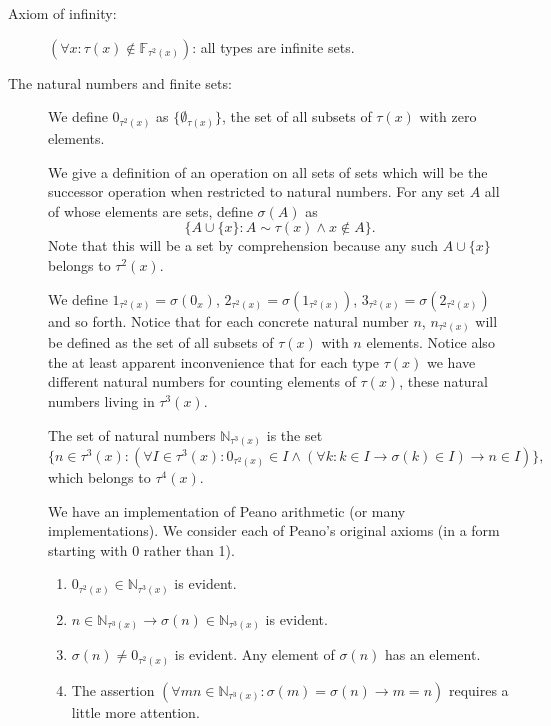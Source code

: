 \documentclass[12pt]{article}
\begin{document}
\begin{description}
\item[Axiom of infinity:]  $(\forall x:\tau(x) \not\in \mathbb F_{\tau^2(x)})$:   all types are infinite sets.

\item[The natural numbers and finite sets:]  We define $0_{\tau^2(x)}$ as $\{\emptyset_{\tau(x)}\}$, the set of all subsets of $\tau(x)$ with zero elements.

We give a definition of an operation on all sets of sets which will be the successor operation when restricted to natural numbers.  For any set $A$ all of whose elements are sets, define $\sigma(A)$ as $$\{A \cup \{x\}:A \sim \tau(x) \wedge x \not\in A\}.$$ Note that this will be a set by comprehension because any such $A \cup \{x\}$ belongs to $\tau^2(x)$.

We define $1_{\tau^2(x)}= \sigma(0_x)$, $2_{\tau^2(x)} = \sigma(1_{\tau^2(x)})$, $3_{\tau^2(x)} = \sigma(2_{\tau^2(x)})$ and so forth.  Notice that for each concrete natural number $n$, $n_{\tau^2(x)}$ will be defined as the set of all subsets of $\tau(x)$ with $n$ elements.  Notice also the at least apparent inconvenience that for each type $\tau(x)$ we have different natural numbers for counting elements of $\tau(x)$, these natural numbers living in $\tau^3(x)$.

The set of natural numbers $\mathbb N_{\tau^3(x)}$ is the set $$\{n \in \tau^3(x):(\forall I\in \tau^3(x):  0_{\tau^2(x)} \in I \wedge (\forall k:k \in I \rightarrow \sigma(k)\in I) \rightarrow n \in I)\},$$ which belongs to $\tau^4(x)$.

We have an implementation of Peano arithmetic (or many implementations).  We consider each of Peano's original axioms (in a form starting with 0 rather than 1).

\begin{enumerate}

\item $0_{\tau^2(x)} \in \mathbb N_{\tau^3(x)}$ is evident.

\item $n \in \mathbb N_{\tau^3(x)} \rightarrow \sigma(n) \in \mathbb N_{\tau^3(x)}$ is evident.

\item  $\sigma(n) \neq 0_{\tau^2(x)}$ is evident.  Any element of $\sigma(n)$ has an element.

\item  The assertion $(\forall mn \in \mathbb N_{\tau^3(x)}:\sigma(m)=\sigma(n) \rightarrow m=n)$ requires a little more attention.


\end{enumerate}
\end{description}
\end{document}
